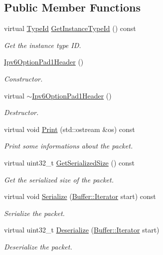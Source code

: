 \subsection*{Public Member Functions}
\begin{DoxyCompactItemize}
\item 
virtual \hyperlink{classns3_1_1TypeId}{Type\+Id} \hyperlink{classns3_1_1Ipv6OptionPad1Header_a246b0396ae690ab19f0f3dc6dc38612f}{Get\+Instance\+Type\+Id} () const 
\begin{DoxyCompactList}\small\item\em Get the instance type ID. \end{DoxyCompactList}\item 
\hyperlink{classns3_1_1Ipv6OptionPad1Header_a14ffd7aceda9467aaa6e9f383665c541}{Ipv6\+Option\+Pad1\+Header} ()
\begin{DoxyCompactList}\small\item\em Constructor. \end{DoxyCompactList}\item 
virtual \hyperlink{classns3_1_1Ipv6OptionPad1Header_aa72d33c6f682f244d42bfe2fd56ec45a}{$\sim$\+Ipv6\+Option\+Pad1\+Header} ()
\begin{DoxyCompactList}\small\item\em Destructor. \end{DoxyCompactList}\item 
virtual void \hyperlink{classns3_1_1Ipv6OptionPad1Header_a247500cd1e7c7795e20d8b41511d635f}{Print} (std\+::ostream \&os) const 
\begin{DoxyCompactList}\small\item\em Print some informations about the packet. \end{DoxyCompactList}\item 
virtual uint32\+\_\+t \hyperlink{classns3_1_1Ipv6OptionPad1Header_a1ba2b2cf2a2c55f2dd601b4bad0b4673}{Get\+Serialized\+Size} () const 
\begin{DoxyCompactList}\small\item\em Get the serialized size of the packet. \end{DoxyCompactList}\item 
virtual void \hyperlink{classns3_1_1Ipv6OptionPad1Header_a0ca6ef1ea4979c726108be11b3f424f5}{Serialize} (\hyperlink{classns3_1_1Buffer_1_1Iterator}{Buffer\+::\+Iterator} start) const 
\begin{DoxyCompactList}\small\item\em Serialize the packet. \end{DoxyCompactList}\item 
virtual uint32\+\_\+t \hyperlink{classns3_1_1Ipv6OptionPad1Header_a88590ad835a1a40d88922dd21b42f0b3}{Deserialize} (\hyperlink{classns3_1_1Buffer_1_1Iterator}{Buffer\+::\+Iterator} start)
\begin{DoxyCompactList}\small\item\em Deserialize the packet. \end{DoxyCompactList}\end{DoxyCompactItemize}
